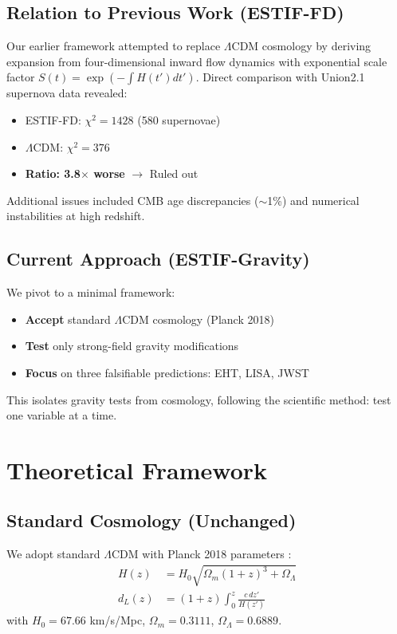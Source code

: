 \documentclass[12pt]{article}
\begin{document}
\subsection{Relation to Previous Work (ESTIF-FD)}

Our earlier framework attempted to replace $\Lambda$CDM cosmology by deriving expansion from four-dimensional inward flow dynamics with exponential scale factor $S(t) = \exp(-\int H(t') dt')$. Direct comparison with Union2.1 supernova data revealed:

\begin{itemize}
    \item ESTIF-FD: $\chi^2 = 1428$ (580 supernovae)
    \item $\Lambda$CDM: $\chi^2 = 376$
    \item \textbf{Ratio: 3.8$\times$ worse} $\rightarrow$ Ruled out
\end{itemize}

Additional issues included CMB age discrepancies ($\sim$1\%) and numerical instabilities at high redshift.

\subsection{Current Approach (ESTIF-Gravity)}

We pivot to a minimal framework:
\begin{itemize}
    \item \textbf{Accept} standard $\Lambda$CDM cosmology (Planck 2018)
    \item \textbf{Test} only strong-field gravity modifications
    \item \textbf{Focus} on three falsifiable predictions: EHT, LISA, JWST
\end{itemize}

This isolates gravity tests from cosmology, following the scientific method: test one variable at a time.

\section{Theoretical Framework}

\subsection{Standard Cosmology (Unchanged)}

We adopt standard $\Lambda$CDM with Planck 2018 parameters \cite{Planck2018}:
\begin{align}
H(z) &= H_0 \sqrt{\Omega_m (1+z)^3 + \Omega_\Lambda} \\
d_L(z) &= (1+z) \int_0^z \frac{c \, dz'}{H(z')}
\end{align}
with $H_0 = 67.66$ km/s/Mpc, $\Omega_m = 0.3111$, $\Omega_\Lambda = 0.6889$.
\end{document}
